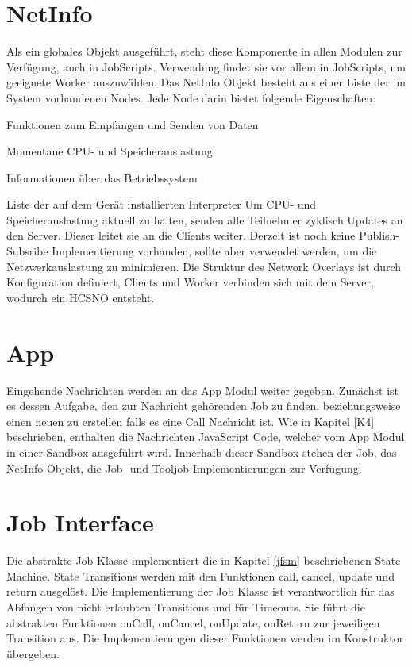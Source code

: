 \section{NetInfo}
Als ein globales Objekt ausgeführt, steht diese Komponente in allen Modulen zur Verfügung, auch in JobScripts.
Verwendung findet sie vor allem in JobScripts, um geeignete Worker auszuwählen.
Das NetInfo Objekt besteht aus einer Liste der im System vorhandenen Nodes.
Jede Node darin bietet folgende Eigenschaften:
\BCL
  \setlength\itemsep{0.0em}
  \item Funktionen zum Empfangen und Senden von Daten
  \item Momentane CPU- und Speicherauslastung
  \item Informationen über das Betriebssystem
  \item Liste der auf dem Gerät installierten Interpreter
\ECL
\noindent Um CPU- und Speicherauslastung aktuell zu halten, senden alle Teilnehmer zyklisch Updates an den Server.
Dieser leitet sie an die Clients weiter.
Derzeit ist noch keine Publish-Subsribe Implementierung vorhanden, sollte aber verwendet werden, um die Netzwerkauslastung zu minimieren.
Die Struktur des Network Overlays ist durch Konfiguration definiert, Clients und Worker verbinden sich mit dem Server, wodurch ein HCSNO entsteht.




\section{App}
Eingehende Nachrichten werden an das App Modul weiter gegeben.
Zunächst ist es dessen Aufgabe, den zur Nachricht gehörenden Job zu finden, beziehungsweise einen neuen zu erstellen falls es eine Call Nachricht ist.
Wie in Kapitel \ref{K4} beschrieben, enthalten die Nachrichten JavaScript Code, welcher vom App Modul in einer Sandbox ausgeführt wird.
Innerhalb dieser Sandbox stehen der Job, das NetInfo Objekt, die Job- und Tooljob-Implementierungen zur Verfügung.




\section{Job Interface}
\label{JobInterface}
Die abstrakte Job Klasse implementiert die in Kapitel \ref{jfsm} beschriebenen State Machine.
State Transitions werden mit den Funktionen call, cancel, update und return ausgelöst.
Die Implementierung der Job Klasse ist verantwortlich für das Abfangen von nicht erlaubten Transitions und für Timeouts.
Sie führt die abstrakten Funktionen onCall, onCancel, onUpdate, onReturn zur jeweiligen Transition aus.
Die Implementierungen  dieser Funktionen werden im Konstruktor übergeben.

